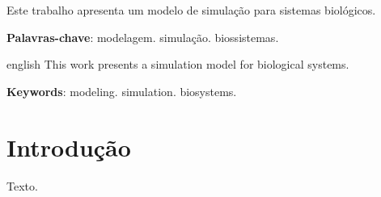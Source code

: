 \documentclass[12pt,oneside,a4paper,english,brazil]{abntex2}
\begin{document}
\imprimircapa
\imprimirfolhaderosto

\begin{resumo}
 Este trabalho apresenta um modelo de simulação
 para sistemas biológicos.

 \textbf{Palavras-chave}: modelagem. simulação. biossistemas.
\end{resumo}

\begin{resumo}[Abstract]
 \begin{otherlanguage*}{english}
   This work presents a simulation model
   for biological systems.

   \vspace{\onelineskip}
   \noindent
   \textbf{Keywords}: modeling. simulation. biosystems.
 \end{otherlanguage*}
\end{resumo}

\textual
\chapter{Introdução}
Texto.
\end{document}
